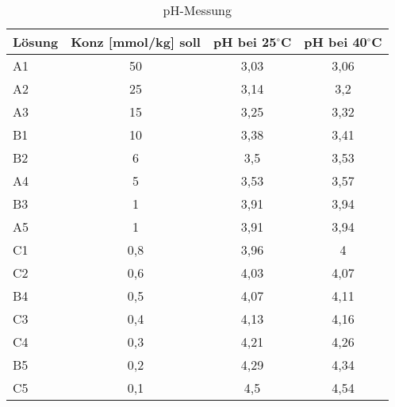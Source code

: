 \begin{table}[H]
    \centering
    \caption{pH-Messung}
      \begin{tabular}{lccc}
      \toprule
      \textbf{Lösung} & \multicolumn{1}{l}{\textbf{Konz [mmol/kg] soll}} & \multicolumn{1}{l}{\textbf{pH bei 25$^\circ$C}} & \multicolumn{1}{l}{\textbf{pH bei 40$^\circ$C}} \\
      \midrule
      A1    & 50    & 3,03  & 3,06 \\
      A2    & 25    & 3,14  & 3,2 \\
      A3    & 15    & 3,25  & 3,32 \\
      B1    & 10    & 3,38  & 3,41 \\
      B2    & 6     & 3,5   & 3,53 \\
      A4    & 5     & 3,53  & 3,57 \\
      B3    & 1     & 3,91  & 3,94 \\
      A5    & 1     & 3,91  & 3,94 \\
      C1    & 0,8   & 3,96  & 4 \\
      C2    & 0,6   & 4,03  & 4,07 \\
      B4    & 0,5   & 4,07  & 4,11 \\
      C3    & 0,4   & 4,13  & 4,16 \\
      C4    & 0,3   & 4,21  & 4,26 \\
      B5    & 0,2   & 4,29  & 4,34 \\
      C5    & 0,1   & 4,5   & 4,54 \\
      \bottomrule
      \end{tabular}%
    \label{tab:addlabel}%
\end{table}%
  
  